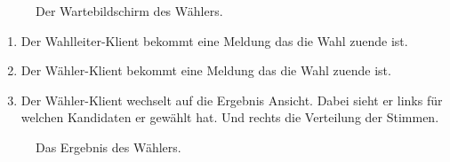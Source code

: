 \documentclass[parskip=full]{scrartcl}
\begin{document}
\begin{figure}[h!]
	\caption{\label{fig:vot_voted}
		Der Wartebildschirm des Wählers.
	}
\end{figure}


		{\begin{enumerate}
			\item Der Wahlleiter-Klient bekommt eine Meldung das die Wahl zuende ist.
			\item Der Wähler-Klient bekommt eine Meldung das die Wahl zuende ist.
			\item Der Wähler-Klient wechselt auf die Ergebnis Ansicht. Dabei sieht er links für welchen Kandidaten er gewählt hat. Und rechts die Verteilung der Stimmen.
		\end{enumerate}}

\begin{figure}[h!]
	\caption{\label{fig:vot_result}
		Das Ergebnis des Wählers.
	}
\end{figure}
\end{document}
